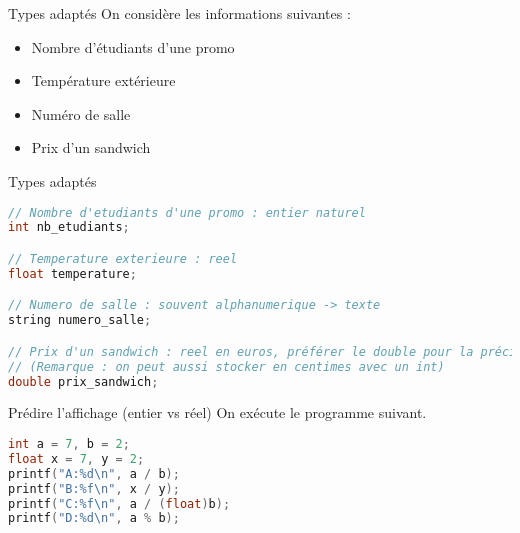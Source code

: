 \begin{UPSTIexercice}{Types adaptés}
    On considère les informations suivantes :
    \begin{itemize}
        \item Nombre d'étudiants d'une promo
        \item Température extérieure
        \item Numéro de salle
        \item Prix d'un sandwich
    \end{itemize}

\end{UPSTIexercice}

\begin{UPSTIprofOnlyEnv}
    \begin{UPSTIcorrectionP}{Types adaptés}
        \begin{lstlisting}[language=C]
// Nombre d'etudiants d'une promo : entier naturel
int nb_etudiants;

// Temperature exterieure : reel
float temperature;

// Numero de salle : souvent alphanumerique -> texte
string numero_salle;

// Prix d'un sandwich : reel en euros, préférer le double pour la précision (cf Niveau 3)
// (Remarque : on peut aussi stocker en centimes avec un int)
double prix_sandwich;\end{lstlisting}
    \end{UPSTIcorrectionP}
\end{UPSTIprofOnlyEnv}


\begin{UPSTIexercice}{Prédire l'affichage (entier vs réel)}
    On exécute le programme suivant.
    \begin{lstlisting}[language=C]
int a = 7, b = 2;
float x = 7, y = 2;
printf("A:%d\n", a / b);
printf("B:%f\n", x / y);
printf("C:%f\n", a / (float)b);
printf("D:%d\n", a % b);
\end{lstlisting}

\end{UPSTIexercice}

